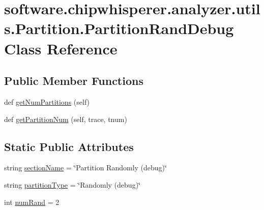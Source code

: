 \hypertarget{classsoftware_1_1chipwhisperer_1_1analyzer_1_1utils_1_1Partition_1_1PartitionRandDebug}{}\section{software.\+chipwhisperer.\+analyzer.\+utils.\+Partition.\+Partition\+Rand\+Debug Class Reference}
\label{classsoftware_1_1chipwhisperer_1_1analyzer_1_1utils_1_1Partition_1_1PartitionRandDebug}
\subsection*{Public Member Functions}
\begin{DoxyCompactItemize}
\item 
def \hyperlink{classsoftware_1_1chipwhisperer_1_1analyzer_1_1utils_1_1Partition_1_1PartitionRandDebug_ae5047f94f2ea26426a4167aff8646517}{get\+Num\+Partitions} (self)
\item 
def \hyperlink{classsoftware_1_1chipwhisperer_1_1analyzer_1_1utils_1_1Partition_1_1PartitionRandDebug_a7ab0112c71081b762bdc4f0a9d61c9cb}{get\+Partition\+Num} (self, trace, tnum)
\end{DoxyCompactItemize}
\subsection*{Static Public Attributes}
\begin{DoxyCompactItemize}
\item 
string \hyperlink{classsoftware_1_1chipwhisperer_1_1analyzer_1_1utils_1_1Partition_1_1PartitionRandDebug_a42952d709a72af3d58d8fbed8d538748}{section\+Name} = \char`\"{}Partition Randomly (debug)\char`\"{}
\item 
string \hyperlink{classsoftware_1_1chipwhisperer_1_1analyzer_1_1utils_1_1Partition_1_1PartitionRandDebug_ae91088044dc7c8c6e36d1a85ea8d1e57}{partition\+Type} = \char`\"{}Randomly (debug)\char`\"{}
\item 
int \hyperlink{classsoftware_1_1chipwhisperer_1_1analyzer_1_1utils_1_1Partition_1_1PartitionRandDebug_a36424577213302de573a405d2e1d34c8}{num\+Rand} = 2
\end{DoxyCompactItemize}


